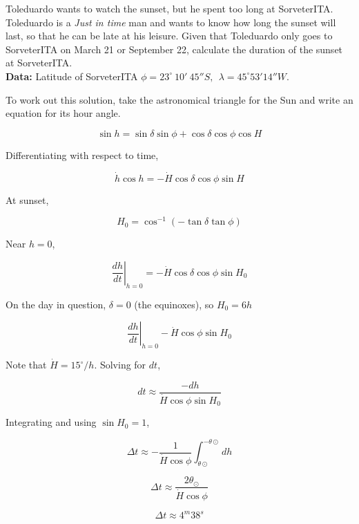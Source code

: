 \documentclass[11pt]{article}
\begin{document}
\begin{pproblem}
    Toleduardo wants to watch the sunset, but he spent too long at SorveterITA. Toleduardo is a \textit{Just in time} man and wants to know how long the sunset will last, so that he can be late at his leisure. Given that Toleduardo only goes to SorveterITA on March 21 or September 22, calculate the duration of the sunset at SorveterITA.
    \\
    \textbf{Data: } Latitude of SorveterITA \(\phi = 23^\circ \ 10' \ 45''S, \ \ \lambda = 45^\circ 53' 14''W\).
\end{pproblem}
\begin{pssolution*}{}{}
    
    To work out this solution, take the astronomical triangle for the Sun and write an equation for its hour angle.

    \[\sin h = \sin\delta\sin\phi + \cos\delta\cos\phi\cos H\] 

    Differentiating with respect to time, 

    \[\dot h \cos h = -\dot H \cos\delta\cos\phi \sin H\]

    At sunset, 

    \[H_0 = \cos^{-1}\left(-\tan\delta\tan\phi\right)\]

    Near \(h=0\), 

    \[\left. \frac{dh}{dt}\right|_{h=0} = -\dot H \cos\delta\cos\phi\sin H_0\]

    On the day in question, \(\delta = 0\) (the equinoxes), so \(H_0 = 6h\)

    \[\left. \frac{dh}{dt}\right|_{h=0} - \dot{H}\cos\phi\sin H_0\]

    Note that \(\dot H = 15^{\circ}/h\). Solving for \(dt\), 
    
    \[dt \approx \frac{-dh}{\dot{H}\cos\phi \sin H_0}\]

    Integrating and using \(\sin H_0 = 1 \), 

    \[\Delta t \approx -\frac{1}{\dot H \cos \phi}\int_{\theta\odot}^{-\theta\odot}dh\]

    \[\Delta t \approx \frac{2\theta_\odot}{\dot H \cos \phi}\]

    \[\boxed{\Delta t \approx 4^m38^s}\]
\end{pssolution*}
\end{document}
